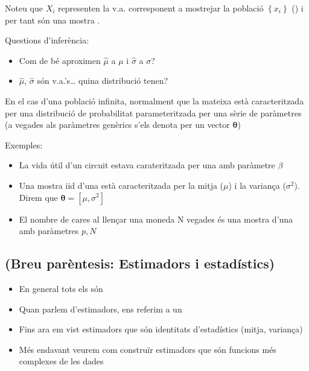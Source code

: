 \documentclass[letterpaper,10pt,english]{sphinxmanual}
\begin{document}
Noteu que \(X_i\) representen la v.a. corresponent a mostrejar la població
\(\left\{x_i\right\}\) () i per tant són una mostra .

Questions d’inferència:
\begin{itemize}
\item {} 
Com de bé aproximen \(\hat{\mu}\) a \(\mu\) i \(\hat{\sigma}\) a \(\sigma\)?

\item {} 
\(\hat{\mu}\), \(\hat{\sigma}\) són v.a.’s… quina distribució tenen?

\end{itemize}

En el cas d’una població infinita, normalment  que la mateixa
està caracteritzada per una distribució de probabilitat parameteritzada per
una sèrie de paràmetres (a vegades als paràmetres genèrics s’els denota per
un vector \(\mathbf{\theta}\))

Exemples:
\begin{itemize}
\item {} 
La vida útil d’un circuit estava carateritzada per una  amb paràmetre \(\beta\)

\item {} 
Una mostra iid d’una  està caracteritzada per la mitja (\(\mu\)) i la variança (\(\sigma^2\)). Direm que \(\mathbf{\theta}=\left[\mu, \sigma^2 \right]\)

\item {} 
El nombre de cares al llençar una moneda N vegades és una mostra d’una  amb paràmetres \(p, N\)

\end{itemize}


\subsection{(Breu parèntesis: Estimadors i estadístics)}
\label{\detokenize{0_Intro/0_2_Intro_stats:breu-parentesis-estimadors-i-estadistics}}\begin{itemize}
\item {} 
En general tots els  són 

\item {} 
Quan parlem d’estimadors, ens referim a un 

\item {} 
Fins ara em vist estimadors que són identitats d’estadístics (mitja, variança)

\item {} 
Més endavant veurem com construïr estimadors que són funcions més complexes de les dades

\end{itemize}
\end{document}
